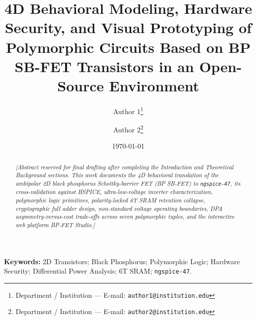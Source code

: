 \documentclass[11pt,a4paper]{article}
\title{\textbf{4D Behavioral Modeling, Hardware Security, and Visual Prototyping of Polymorphic Circuits Based on BP SB-FET Transistors in an Open-Source Environment}}
\author{
  Author 1\thanks{Department / Institution --- E-mail: \texttt{author1@institution.edu}} \and
  Author 2\thanks{Department / Institution --- E-mail: \texttt{author2@institution.edu}}
}
\date{\today}
\begin{document}
\maketitle

\begin{abstract}
\noindent\textit{[Abstract reserved for final drafting after completing the Introduction and Theoretical Background sections. This work documents the 4D behavioral translation of the ambipolar 2D black phosphorus Schottky-barrier FET (BP SB-FET) to \texttt{ngspice-47}, its cross-validation against HSPICE, ultra-low-voltage inverter characterization, polymorphic logic primitives, polarity-locked 6T SRAM retention collapse, cryptographic full adder design, non-standard voltage operating boundaries, DPA asymmetry-versus-cost trade-offs across seven polymorphic tuples, and the interactive web platform BP-FET Studio.]}
\end{abstract}

\vspace{0.5em}
\noindent\textbf{Keywords:} 2D Transistors; Black Phosphorus; Polymorphic Logic; Hardware Security; Differential Power Analysis; 6T SRAM; \texttt{ngspice-47}.









\end{document}
